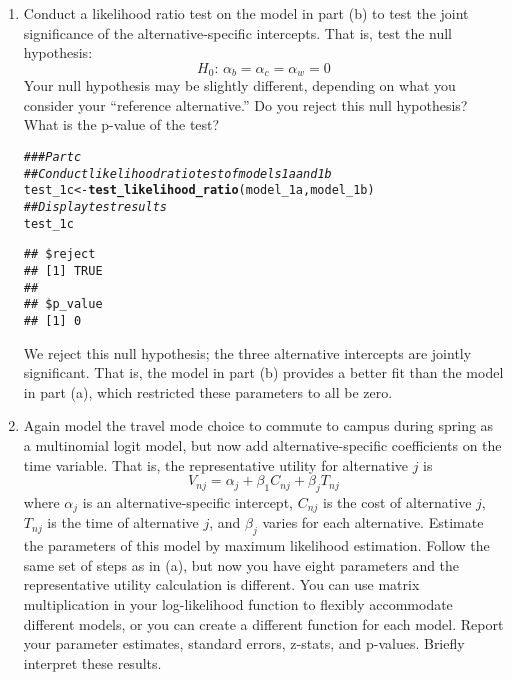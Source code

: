 \documentclass[11pt,letterpaper]{article}\usepackage[]{graphicx}\usepackage[]{color}
\makeatletter
\newcommand{\hlcom}[1]{\textcolor[rgb]{0.678,0.584,0.686}{\textit{#1}}}%
\newcommand{\hlstd}[1]{\textcolor[rgb]{0.345,0.345,0.345}{#1}}%
\newcommand{\hlkwb}[1]{\textcolor[rgb]{0.69,0.353,0.396}{#1}}%
\newcommand{\hlkwd}[1]{\textcolor[rgb]{0.737,0.353,0.396}{\textbf{#1}}}%
\newenvironment{kframe}{%
 \def\at@end@of@kframe{}%
 \ifinner\ifhmode%
  \def\at@end@of@kframe{\end{minipage}}%
  \begin{minipage}{\columnwidth}%
 \fi\fi%
 \def\FrameCommand##1{\hskip\@totalleftmargin \hskip-\fboxsep
 \colorbox{shadecolor}{##1}\hskip-\fboxsep
     \hskip-\linewidth \hskip-\@totalleftmargin \hskip\columnwidth}%
 \MakeFramed {\advance\hsize-\width
   \@totalleftmargin\z@ \linewidth\hsize
   \@setminipage}}%
 {\par\unskip\endMakeFramed%
 \at@end@of@kframe}
\newenvironment{knitrout}{}{} %
\makeatother
\begin{document}
\begin{enumerate}[label=\alph*., leftmargin=*]
	\item Conduct a likelihood ratio test on the model in part (b) to test the joint significance of the alternative-specific intercepts. That is, test the null hypothesis:
	$$H_0 \text{: } \alpha_b = \alpha_c = \alpha_w = 0$$
	Your null hypothesis may be slightly different, depending on what you consider your ``reference alternative.'' Do you reject this null hypothesis? What is the p-value of the test?

\begin{knitrout}
\color{fgcolor}\begin{kframe}
\begin{alltt}
\hlcom{### Part c}
\hlcom{## Conduct likelihood ratio test of models 1a and 1b}
\hlstd{test_1c} \hlkwb{<-} \hlkwd{test_likelihood_ratio}\hlstd{(model_1a, model_1b)}
\hlcom{## Display test results}
\hlstd{test_1c}
\end{alltt}
\begin{verbatim}
## $reject
## [1] TRUE
## 
## $p_value
## [1] 0
\end{verbatim}
\end{kframe}
\end{knitrout}

	We reject this null hypothesis; the three alternative intercepts are jointly significant. That is, the model in part (b) provides a better fit than the model in part (a), which restricted these parameters to all be zero.
	
	\item Again model the travel mode choice to commute to campus during spring as a multinomial logit model, but now add alternative-specific coefficients on the time variable. That is, the representative utility for alternative $j$ is
	$$V_{nj} = \alpha_j + \beta_1 C_{nj} + \beta_j T_{nj}$$
	where $\alpha_j$ is an alternative-specific intercept, $C_{nj}$ is the cost of alternative $j$, $T_{nj}$ is the time of alternative $j$, and $\beta_j$ varies for each alternative. Estimate the parameters of this model by maximum likelihood estimation. Follow the same set of steps as in (a), but now you have eight parameters and the representative utility calculation is different. You can use matrix multiplication in your log-likelihood function to flexibly accommodate different models, or you can create a different function for each model. Report your parameter estimates, standard errors, z-stats, and p-values. Briefly interpret these results.


\end{enumerate}
\end{document}
